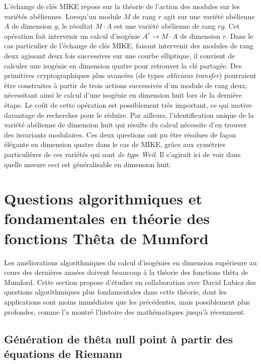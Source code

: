 \documentclass[a4paper,10pt]{scrartcl}
\theoremstyle{definition}
\theoremstyle{plain}
\theoremstyle{definition}
\renewcommand{\(}{\left(}
\renewcommand{\)}{\right)}
\begin{document}
L'échange de clés MIKE repose sur la théorie de l'action des modules sur les variétés abéliennes. Lorsqu'un module $M$ de rang $r$ agit sur une variété abélienne $A$ de dimension $g$, le résultat $M\cdot A$ est une variété abélienne de rang $rg$. Cet opération fait intervenir un calcul d'isogénie $A^r\to M\cdot A$ de dimension $r$. Dans le cas particulier de l'échange de clés MIKE, faisant intervenir des modules de rang deux agissant deux fois successives sur une courbe elliptique, il convient de calculer une isogénie en dimension quatre pour retrouver la clé partagée. Des primitives cryptographiques plus avancées (de types \emph{oblivious transfer}) pourraient être construites à partir de trois actions successives d'un module de rang deux, nécessitant ainsi le calcul d'une isogénie en dimension huit lors de la dernière étape. Le coût de cette opération est possiblement très important, ce qui motive davantage de recherches pour le réduire. Par ailleurs, l'identification unique de la variété abélienne de dimension huit qui résulte du calcul nécessite d'en trouver des invariants modulaires. Ces deux questions ont pu être résolues de façon élégante en dimension quatre dans le cas de MIKE, grâce aux symétries particulières de ces variétés qui sont \emph{de type Weil}. Il s'agirait ici de voir dans quelle mesure ceci est généralisable en dimension huit.



\section{Questions algorithmiques et fondamentales en théorie des fonctions Thêta de Mumford}\label{SecTheta}

Les améliorations algorithmiques du calcul d'isogénies en dimension supérieure au cours des dernières années doivent beaucoup à la théorie des fonctions thêta de Mumford. Cette section propose d'étudier en collaboration avec David Lubicz des questions algorithmiques plus fondamentales dans cette théorie, dont les applications sont moins immédiates que les précédentes, mais possiblement plus profondes, comme l'a montré l'histoire des mathématiques jusqu'à récemment.

\subsection{Génération de thêta null point à partir des équations de Riemann}
\end{document}
